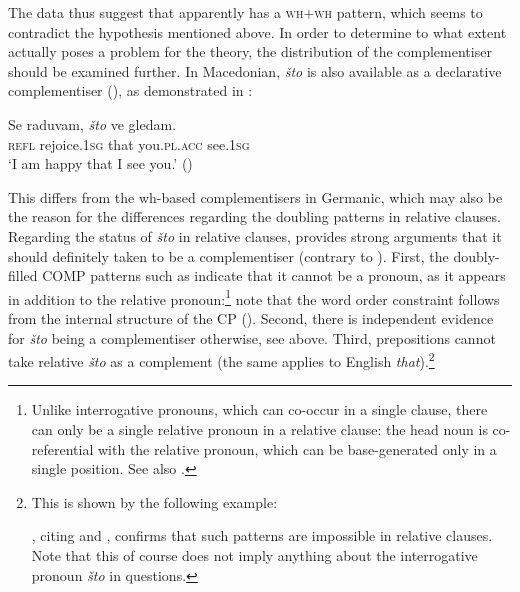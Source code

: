 \documentclass[output=paper]{langscibook}
\begin{document}
\noindent The data thus suggest that  apparently has a \textsc{wh}$+$\textsc{wh} pattern, which seems to contradict the hypothesis mentioned above. In order to determine to what extent  actually poses a problem for the theory, the distribution of the complementiser should be examined further. In Macedonian, \textit{što} is also available as a declarative complementiser (\citealt{rudin2014}), as demonstrated in :

\ea \gll Se raduvam, \textit{što} ve gledam. \label{bacsk:ex:stomac}\\
\textsc{refl} rejoice.\textsc{1sg} that you.\textsc{pl.acc} see.\textsc{1sg}\\
\glt `I am happy that I see you.' \hfill (\citealt[419]{tomic2006})
\z

\noindent This differs from the wh-based complementisers in Germanic, which may also be the reason for the differences regarding the doubling patterns in relative clauses. Regarding the status of \textit{što} in relative clauses, \citet[320]{rudin2014} provides strong arguments that it should definitely taken to be a complementiser (contrary to \citealt{tomic2012}). First, the doubly-filled COMP patterns such as  indicate that it cannot be a pronoun, as it appears in addition to the relative pronoun:\footnote{Unlike interrogative pronouns, which can co-occur in a single clause, there can only be a single relative pronoun in a relative clause: the head noun is co-referential with the relative pronoun, which can be base-generated only in a single position. See also \citet[320]{rudin2014}.} note that the word order constraint follows from the internal structure of the CP (\citealt{bacskaiatkari2018slavic, bacskaiatkari2020jcgl}). Second, there is independent evidence for \textit{što} being a complementiser otherwise, see  above. Third, prepositions cannot take relative \textit{što} as a complement (the same applies to English \textit{that}).\footnote{This is shown by the following example:

\z

\noindent \citet[320]{rudin2014}, citing \citet{tomic2012} and \citet{kramer1999}, confirms that such patterns are impossible in relative clauses. Note that this of course does not imply anything about the interrogative pronoun \textit{što} in questions.}
\end{document}
